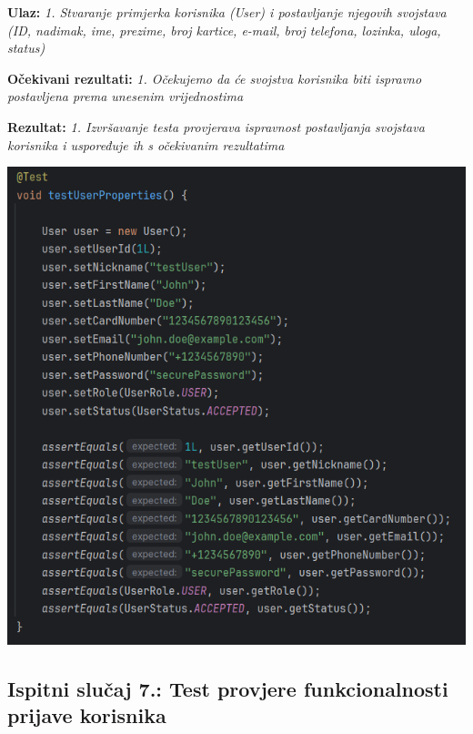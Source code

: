                                                                                     \textbf{Ulaz:}
                                                                                    \textit{1. Stvaranje primjerka korisnika (User) i postavljanje njegovih svojstava (ID, nadimak, ime, prezime, broj kartice, e-mail, broj telefona, lozinka, uloga, status)}

                                                                                    \textbf{Očekivani rezultati:}
                                                                                    \textit{1. Očekujemo da će svojstva korisnika biti ispravno postavljena prema unesenim vrijednostima}

                                                                                    \textbf{Rezultat:}
                                                                                    \textit{1. Izvršavanje testa provjerava ispravnost postavljanja svojstava korisnika i uspoređuje ih s očekivanim rezultatima}


            \includegraphics[width=1\linewidth]{slike/UserTest.png}


            \subsection{Ispitni slučaj 7.: Test provjere funkcionalnosti prijave korisnika}

